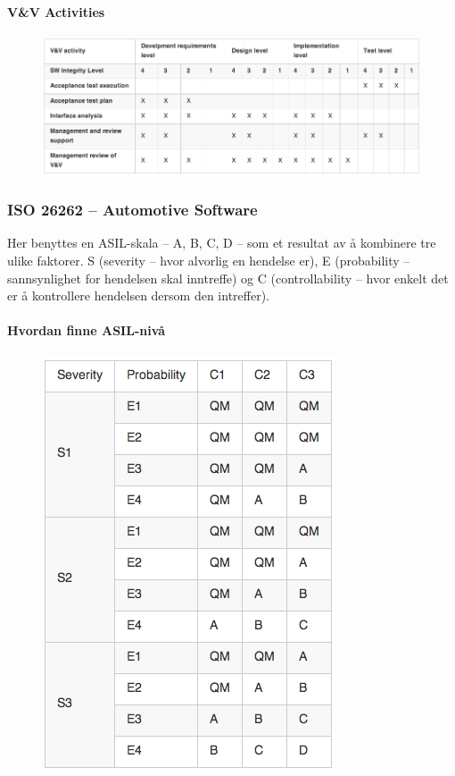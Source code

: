 \paragraph{V\&V Activities}

\begin{figure}[htbp]
\centering
\includegraphics{Forelesning 06/img/tabell2.png}
\caption{}
\end{figure}

\subsubsection{ISO 26262 -- Automotive Software}

Her benyttes en ASIL-skala -- A, B, C, D -- som et resultat av å
kombinere tre ulike faktorer. S (severity -- hvor alvorlig en hendelse
er), E (probability -- sannsynlighet for hendelsen skal inntreffe) og C
(controllability -- hvor enkelt det er å kontrollere hendelsen dersom
den intreffer).

\paragraph{Hvordan finne ASIL-nivå}

\begin{figure}[htbp]
\centering
\includegraphics{Forelesning 06/img/tabell3.png}
\caption{}
\end{figure}

